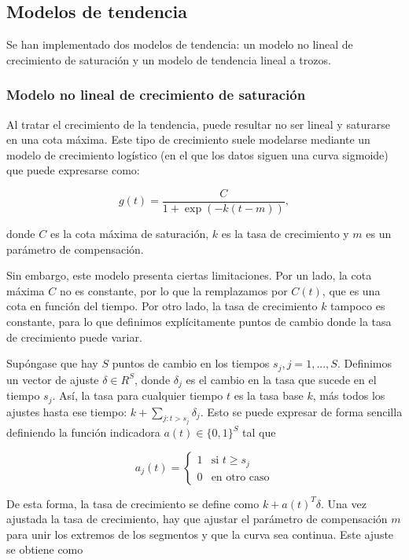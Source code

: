 \documentclass[12pt,twoside]{article}
\begin{document}
\subsection{Modelos de tendencia}\label{sec:2}

Se han implementado dos modelos de tendencia: un modelo no lineal de crecimiento de saturación y un modelo de tendencia lineal a trozos.

\subsubsection{Modelo no lineal de crecimiento de saturación}\label{sec:3}

Al tratar el crecimiento de la tendencia, puede resultar no ser lineal y saturarse en una cota máxima. Este tipo de crecimiento suele modelarse mediante un modelo de crecimiento logístico (en el que los datos siguen una curva sigmoide) que puede expresarse como:

\begin{equation}
g(t) = \frac{C}{1 + \exp(-k (t - m))},
\end{equation}

donde $C$ es la cota máxima de saturación, $k$ es la tasa de crecimiento y $m$ es un parámetro de compensación.

Sin embargo, este modelo presenta ciertas limitaciones. Por un lado, la cota máxima $C$ no es constante, por lo que la remplazamos por $C(t)$, que es una cota en función del tiempo. Por otro lado, la tasa de crecimiento $k$ tampoco es constante, para lo que definimos explícitamente puntos de cambio donde la tasa de crecimiento puede variar. 

Supóngase que hay $S$ puntos de cambio en los tiempos $s_j, j = 1, ..., S$. Definimos un vector de ajuste $\delta \in R^S$, donde $\delta_j$ es el cambio en la tasa que sucede en el tiempo $s_j$. Así, la tasa para cualquier tiempo $t$ es la tasa base $k$, más todos los ajustes hasta ese tiempo: $k + \sum_{j:t > s_j} \delta_j$. Esto se puede expresar de forma sencilla definiendo la función indicadora $a(t) \in \{0,1\}^S$ tal que 

\begin{equation}
a_j(t) = 
\begin{cases}
1 & \text{si } t \geq s_j \\
0 & \text{en otro caso}
\end{cases}
\end{equation}

De esta forma, la tasa de crecimiento se define como $k + a(t)^T \delta$. Una vez ajustada la tasa de crecimiento, hay que ajustar el parámetro de compensación $m$ para unir los extremos de los segmentos y que la curva sea continua. Este ajuste se obtiene como 
\end{document}
